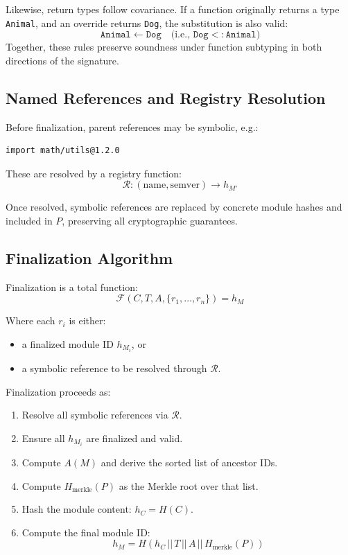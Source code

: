 \documentclass[sigplan,screen]{acmart}
\begin{document}
Likewise, return types follow covariance. If a function originally returns a type \texttt{Animal}, and an override returns \texttt{Dog}, the substitution is also valid:
\[
\texttt{Animal} \leftarrow \texttt{Dog} \quad\text{(i.e., } \texttt{Dog} <: \texttt{Animal}\text{)}
\]
Together, these rules preserve soundness under function subtyping in both directions of the signature.

\subsection{Named References and Registry Resolution}

Before finalization, parent references may be symbolic, e.g.:
\begin{verbatim}
import math/utils@1.2.0
\end{verbatim}

These are resolved by a registry function:
\[
\mathcal{R}: (\text{name}, \text{semver}) \rightarrow h_{M'}
\]

Once resolved, symbolic references are replaced by concrete module hashes and included in $P$, preserving all cryptographic guarantees.

\subsection{Finalization Algorithm}

Finalization is a total function:
\[
\mathcal{F}(C, T, A, \{r_1, \ldots, r_n\}) = h_M
\]

Where each $r_i$ is either:
\begin{itemize}
    \item a finalized module ID $h_{M_i}$, or
    \item a symbolic reference to be resolved through $\mathcal{R}$.
\end{itemize}

Finalization proceeds as:

\begin{enumerate}
    \item Resolve all symbolic references via $\mathcal{R}$.
    \item Ensure all $h_{M_i}$ are finalized and valid.
    \item Compute $A(M)$ and derive the sorted list of ancestor IDs.
    \item Compute $H_{\text{merkle}}(P)$ as the Merkle root over that list.
    \item Hash the module content: $h_C = H(C)$.
    \item Compute the final module ID:
    \[
    h_M = H(h_C \, || \, T \, || \, A \, || \, H_{\text{merkle}}(P))
    \]
\end{enumerate}
\end{document}

